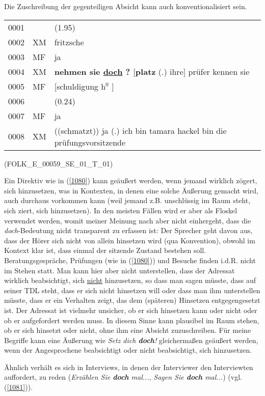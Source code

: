 {Die Zuschreibung der gegenteiligen Absicht kann auch konventionalisiert sein. 
	
\begin{exe}
	\ex\label{1080} 
	\scriptsize
    \begin{tabular}[t]{lll}
	0001 & & (1.95)\\
	0002 &	XM & fritzsche\\
	0003 & MF & ja\\
	0004 & XM &	\textbf{nehmen sie \underline{doch} ? $[$platz} (.) ihre$]$ prüfer kennen sie\\
	0005 & MF &	$[$schuldigung h$^{0}$ $]$\\
	0006 & & (0.24)\\
	0007 & MF & ja\\
	0008 & XM & ((schmatzt)) ja (.) ich bin tamara hackel bin die prüfungsvorsitzende
	\end{tabular}
	\newline
	\hbox{}\hfill\hbox{(FOLK\_E\_00059\_SE\_01\_T\_01)} 					        
\end{exe}
Ein Direktiv wie in (\ref{1080}) kann geäußert werden, wenn jemand wirklich zögert, sich hinzusetzen, was in Kontexten, in denen eine solche Äußerung gemacht wird, auch durchaus vorkommen kann (weil jemand z.B. unschlüssig im Raum steht, sich ziert, sich hinzusetzen). In den meisten Fällen wird er aber als Floskel verwendet werden, womit meiner Meinung nach aber nicht einhergeht, dass die \textit{doch}-Bedeutung nicht transparent zu erfassen ist: Der Sprecher geht davon aus, dass der Hörer sich nicht von allein hinsetzen wird (qua Konvention), obwohl im Kontext klar ist, dass einmal der sitzende Zustand bestehen soll. Beratungsgespräche, Prüfungen (wie in (\ref{1080})) und Besuche finden i.d.R. nicht im Stehen statt. Man kann hier aber nicht unterstellen, dass der Adressat wirklich beabsichtigt, sich \underline{nicht} hinzusetzen, so dass man sagen müsste, dass auf seiner TDL steht, dass er sich nicht hinsetzen will oder dass man ihm unterstellen müsste, dass er ein Verhalten zeigt, das dem (späteren) Hinsetzen entgegengesetzt ist. Der Adressat ist vielmehr unsicher, ob er sich hinsetzen kann oder nicht oder ob er aufgefordert werden muss. In diesem Sinne kann plausibel im Raum stehen, ob er sich hinsetzt oder nicht, ohne ihm eine Absicht zuzuschreiben. Für meine Begriffe kann eine Äußerung wie \textit{Setz dich \textbf{doch}!} gleichermaßen geäußert werden, wenn der Angesprochene beabsichtigt oder nicht beabsichtigt, sich hinzusetzen.

Ähnlich verhält es sich in Interviews, in denen der Interviewer den Interviewten auffordert, zu reden (\textit{Erzählen Sie \textbf{doch} mal...}, \textit{Sagen Sie \textbf{doch} mal...}) (vgl. (\ref{1081})).

}
